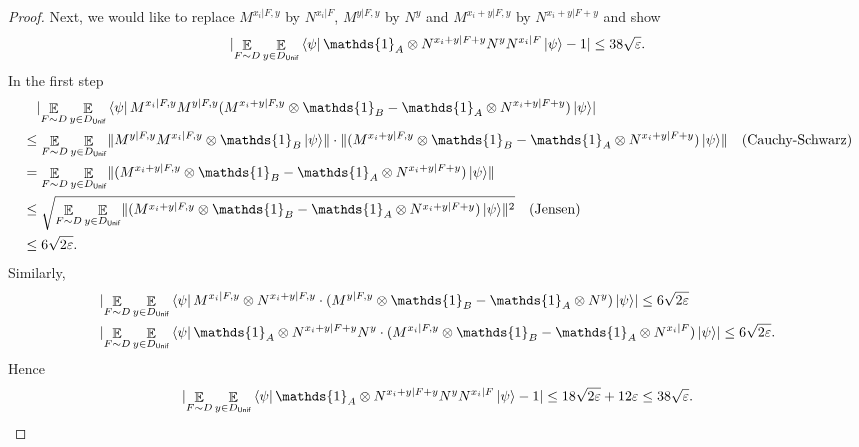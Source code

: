 \documentclass[11pt]{article}
\theoremstyle{plain}
\theoremstyle{definition}
\DeclarePairedDelimiter{\norm}{\lVert}{\rVert}
\DeclarePairedDelimiter{\abs}{\lvert}{\rvert}
\newcommand {\bra} [1] {\ensuremath{ \left\langle #1 \right| }}
\newcommand {\ket} [1] {\ensuremath{ \left| #1 \right\rangle }}
\DeclareMathOperator*{\bigE}{\mathbb{E}}
\newcommand {\id} {\ensuremath{\mathds{1}}}
\newcommand{\ep} {\ensuremath{\varepsilon}}
\newcommand{\x}{\otimes}
\newcommand{\1}{\mathbb{1}} %
\newcommand{\Unif}{\mathsf{Unif}}
\begin{document}
\begin{proof}
Next, we would like to replace $M^{x_i | F, y}$ by $N^{x_i | F}$, $M^{y | F,y}$ by $N^y$ and $M^{x_i +y | F,y}$ by $N^{x_i+y|F+y}$
and show 
\begin{align}
	\label{eq:N_xy}
	\abs{\bigE_{F \sim D}  \bigE_{y \in D_{\Unif}} \bra{\psi} \id_A \x N^{x_i+y| F+y} N^y N^{x_i  | F } \ket{\psi}-1} \leq 38\sqrt{\ep}.
\end{align}
In the first step
\begin{align*}
	&\quad \abs{ \bigE_{F \sim D}  \bigE_{y \in D_{\Unif}} \bra{\psi} M^{x_i | F, y} M^{y | F, y} ( M^{x_i+y| F, y}\x\id_B -\id_A \x N^{x_i+y | F + y}) \ket{\psi} }\\
	&\leq \bigE_{F \sim D}  \bigE_{y \in D_{\Unif}} \norm{ M^{y | F, y} M^{x_i | F, y} \x \id_B \ket{\psi}}
	\cdot \norm{ (M^{x_i+y| F, y} \x\id_B- \id_A \x N^{x_i+y | F + y}) \ket{\psi} } \quad\mbox{(Cauchy-Schwarz)}\\
	&= \bigE_{F \sim D}  \bigE_{y \in D_{\Unif}} \norm{ (M^{x_i+y| F, y}\x\id_B - \id_A \x N^{x_i+y | F + y}) \ket{\psi} } \\
	& \leq \sqrt{  \bigE_{F \sim D}  \bigE_{y \in D_{\Unif}} \norm{ (M^{x_i+y| F, y} \x \id_B- \id_A \x N^{x_i+y | F + y}) \ket{\psi} }^2 } \quad\mbox{(Jensen)}\\
	& \leq 6\sqrt{2\ep}.
\end{align*}
Similarly,
\begin{align*}
	&\abs{ \bigE_{F \sim D}  \bigE_{y \in D_{\Unif}} \bra{\psi} M^{x_i | F, y} \x N^{x_i+ y | F, y} \cdot ( M^{y | F, y} \x \id_B - \id_A \x N^y) \ket{\psi}}  \leq 6\sqrt{2\ep} \\
	&\abs{ \bigE_{F \sim D}  \bigE_{y \in D_{\Unif}} \bra{\psi} \id_A \x N^{x_i+y | F + y} N^y \cdot  (M^{x_i | F,y} \x \id_B - \id_A \x N^{x_i | F}) \ket{\psi}} \leq 6\sqrt{2\ep} .
\end{align*}
Hence 
\begin{align*}
	\abs{  \bigE_{F \sim D}  \bigE_{y \in D_{\Unif}} \bra{\psi}  \id_A \x N^{x_i+y | F + y} N^y N^{x_i | F} \ket{\psi} - 1} \leq 18\sqrt{2\ep} + 12 \ep \leq 38\sqrt{\ep}.
\end{align*}


\end{proof}
\end{document}
